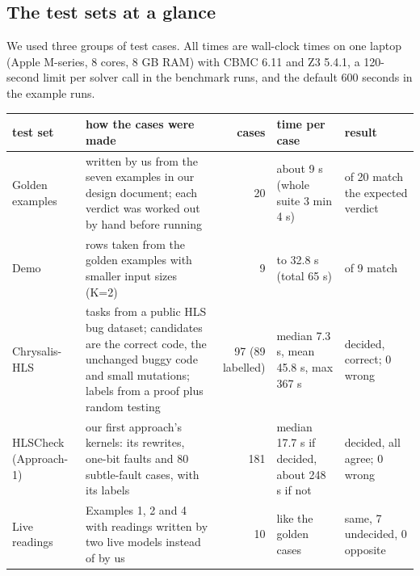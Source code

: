 \documentclass[10pt,a4paper]{article}
\begin{document}
\subsection{The test sets at a glance}
We used three groups of test cases. All times are wall-clock times on one laptop (Apple M-series,
8 cores, 8 GB RAM) with CBMC 6.11 and Z3 5.4.1, a 120-second limit per solver call in the
benchmark runs, and the default 600 seconds in the example runs.
\begin{center}\small
\noindent\begin{tabularx}{\linewidth}{@{}>{\raggedright\arraybackslash}p{2.0cm}>{\raggedright\arraybackslash}X r >{\raggedright\arraybackslash}p{2.0cm} >{\raggedright\arraybackslash}p{2.8cm}@{}}\toprule
test set & how the cases were made & cases & time per case & result\\\midrule
Golden examples & written by us from the seven examples in our design document; each verdict
was worked out by hand before running & 20 & about 9 s (whole suite 3 min 4 s) & 20 of 20 match the
expected verdict\\
Demo & 9 rows taken from the golden examples with smaller input sizes (K=2) & 9 & 0.6 to 32.8 s
(total 65 s) & 9 of 9 match\\
Chrysalis-HLS & 20 tasks from a public HLS bug dataset; candidates are the correct code, the
unchanged buggy code and small mutations; labels from a proof plus random testing & 97 (89
labelled) & median 7.3 s, mean 45.8 s, max 367 s & 1 decided, correct; 0 wrong\\
HLSCheck (Approach-1) & our first approach's kernels: its rewrites, one-bit faults and 80
subtle-fault cases, with its labels & 181 & median 17.7 s if decided, about 248 s if not & 125
decided, all agree; 0 wrong\\
Live readings & Examples 1, 2 and 4 with readings written by two live models instead of by us & 10
& like the golden cases & 3 same, 7 undecided, 0 opposite\\\bottomrule
\end{tabularx}\end{center}
\end{document}
